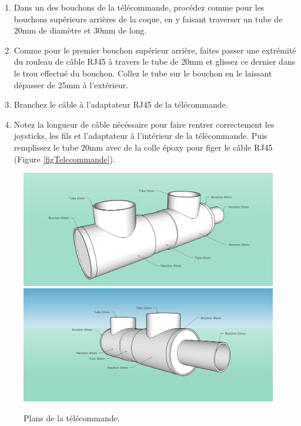 \documentclass[11pt,a4paper]{article}
\begin{document}
\begin{enumerate}
          \item Dans un des bouchons de la télécommande, procédez comme pour les bouchons supérieurs arrières de la coque, en y faisant traverser un tube de 20mm de diamètre et 30mm de long.
          
          \item Comme pour le premier bouchon supérieur arrière, faites passer une extrémité du rouleau de câble RJ45 à travers le tube de 20mm et glissez ce dernier dans le trou effectué du bouchon. Collez le tube sur le bouchon en le laissant dépasser de 25mm à l'extérieur. 
          
          \item Branchez le câble à l'adaptateur RJ45 de la télécommande.
          
          \item Notez la longueur de câble nécéssaire pour faire rentrer correctement les joysticks, les fils et l'adaptateur à l'intérieur de la télécommande. Puis remplissez le tube 20mm avec de la colle époxy pour figer le câble RJ45 (Figure \ref{figTelecommande}).
          
        \end{enumerate}
        
        \begin{figure}[H]
          \centering
          \includegraphics[scale=0.44]{ROVTelecommandeGlobal.jpg}
          \includegraphics[scale=0.44]{ROVTelecommandeGlobal2.jpg}
          \caption{Plans de la télécommande.}
          \label{figPlansTelecommande}
        \end{figure}
        
\end{document}

